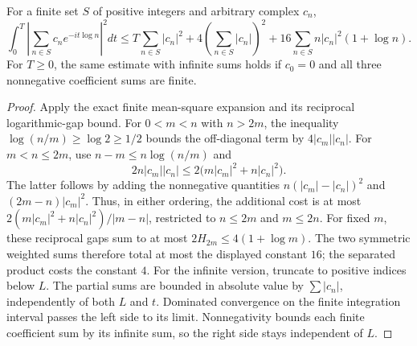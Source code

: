\begin{lemma}
\label{construction:weighted-mean-square}
\leanok
For a finite set $S$ of positive integers and arbitrary complex $c_n$,
\[
 \int_0^T\left|\sum_{n\in S}c_ne^{-it\log n}\right|^2dt
 \le T\sum_{n\in S}|c_n|^2
   +4\left(\sum_{n\in S}|c_n|\right)^2
   +16\sum_{n\in S}n|c_n|^2(1+\log n).
\]
For $T\ge0$, the same estimate with infinite sums holds if $c_0=0$
and all three nonnegative coefficient sums are finite.
\end{lemma}
\begin{proof}
Apply the exact finite mean-square expansion and its reciprocal
logarithmic-gap bound.
For $0<m<n$ with $n>2m$, the inequality
$\log(n/m)\ge\log2\ge1/2$ bounds the off-diagonal term by
$4|c_m||c_n|$.
For $m<n\le2m$, use $n-m\le n\log(n/m)$ and
\[
 2n|c_m||c_n|
 \le2\bigl(m|c_m|^2+n|c_n|^2\bigr).
\]
The latter follows by adding the nonnegative quantities
$n(|c_m|-|c_n|)^2$ and $(2m-n)|c_m|^2$.
Thus, in either ordering, the additional cost is at most
$2(m|c_m|^2+n|c_n|^2)/|m-n|$, restricted to
$n\le2m$ and $m\le2n$.
For fixed $m$, these reciprocal gaps sum to at most
$2H_{2m}\le4(1+\log m)$.
The two symmetric weighted sums therefore total at most the displayed
constant $16$; the separated product costs the constant $4$.
For the infinite version, truncate to positive indices below $L$.
The partial sums are bounded in absolute value by $\sum|c_n|$,
independently of both $L$ and $t$.
Dominated convergence on the finite integration interval passes the
left side to its limit.  Nonnegativity bounds each finite coefficient
sum by its infinite sum, so the right side stays independent of $L$.
\end{proof}

